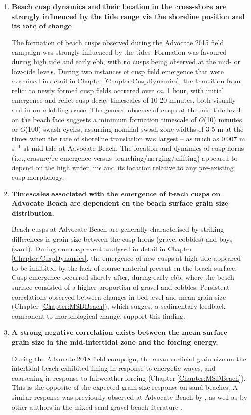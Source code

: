 \begin{enumerate}
	
	\item \textbf{Beach cusp dynamics and their location in the cross-shore are strongly influenced by the tide range via the shoreline position and its rate of change.}
	
	The formation of beach cusps observed during the Advocate 2015 field campaign was strongly influenced by the tides. Formation was favoured during high tide and early ebb, with no cusps being observed at the mid- or low-tide levels. During two instances of cusp field emergence that were examined in detail in Chapter \ref{Chapter:CuspDynamics}, the transition from relict to newly formed cusp fields occurred over \textit{ca}. 1 hour, with initial emergence and relict cusp decay timescales of 10-20 minutes, both visually and in an $e$-folding sense. The general absence of cusps at the mid-tide level on the beach face suggests a minimum formation timescale of $O$(10) minutes, or $O$(100) swash cycles, assuming nominal swash zone widths of 3-5 m at the times when the rate of shoreline translation was largest -- as much as 0.007 m s$^{-1}$ at mid-tide at Advocate Beach. The location and dynamics of cusp horns (i.e., erasure/re-emergence versus branching/merging/shifting) appeared to depend on the high water line and its location relative to any pre-existing cusp morphology. 
	
	
	\item \textbf{Timescales associated with the emergence of beach cusps on Advocate Beach are dependent on the beach surface grain size distribution.}
	
	Beach cusps at Advocate Beach are generally characterised by striking differences in grain size between the cusp horns (gravel-cobbles) and bays (sand). During one cusp event analysed in detail in Chapter \ref{Chapter:CuspDynamics}, the emergence of new cusps at high tide appeared to be inhibited by the lack of coarse material present on the beach surface. Cusp emergence occurred shortly after, during early ebb, where the beach surface consisted of a higher proportion of gravel and cobbles. Persistent correlations observed between changes in bed level and mean grain size (Chapter \ref{Chapter:MSDBeach}), which suggest a sedimentary feedback component to morphological change, support this finding.

	
	\item \textbf{A strong negative correlation exists between the mean surface grain size in the mid-intertidal zone and the forcing energy.} 
	
	During the Advocate 2018 field campaign, the mean surficial grain size on the intertidal beach exhibited fining in response to energetic waves, and coarsening in response to fairweather forcing (Chapter \ref{Chapter:MSDBeach}). This is the opposite of the expected grain size response on sand beaches. A similar response was previously observed at Advocate Beach by \citet[][]{Hay_etal2014}, as well as by other authors in the mixed sand gravel beach literature \citep{Nordstrom_Jackson1993, Pontee_etal2004, Curtiss_etal2009, Miller_etal2011}. %
	

\end{enumerate}
